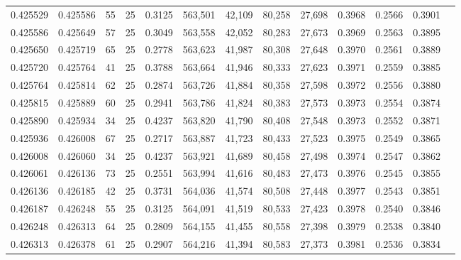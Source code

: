 \begin{tabular}{rrrrrrrrrrrrr}
0.425529 & 0.425586 &    55 &  25 &                                     0.3125 & 563,501 &  42,109 &  80,258 &  27,698 & 0.3968 & 0.2566 & 0.3901 \\
0.425586 & 0.425649 &    57 &  25 &                                     0.3049 & 563,558 &  42,052 &  80,283 &  27,673 & 0.3969 & 0.2563 & 0.3895 \\
0.425650 & 0.425719 &    65 &  25 &                                     0.2778 & 563,623 &  41,987 &  80,308 &  27,648 & 0.3970 & 0.2561 & 0.3889 \\
0.425720 & 0.425764 &    41 &  25 &                                     0.3788 & 563,664 &  41,946 &  80,333 &  27,623 & 0.3971 & 0.2559 & 0.3885 \\
0.425764 & 0.425814 &    62 &  25 &                                     0.2874 & 563,726 &  41,884 &  80,358 &  27,598 & 0.3972 & 0.2556 & 0.3880 \\
0.425815 & 0.425889 &    60 &  25 &                                     0.2941 & 563,786 &  41,824 &  80,383 &  27,573 & 0.3973 & 0.2554 & 0.3874 \\
0.425890 & 0.425934 &    34 &  25 &                                     0.4237 & 563,820 &  41,790 &  80,408 &  27,548 & 0.3973 & 0.2552 & 0.3871 \\
0.425936 & 0.426008 &    67 &  25 &                                     0.2717 & 563,887 &  41,723 &  80,433 &  27,523 & 0.3975 & 0.2549 & 0.3865 \\
0.426008 & 0.426060 &    34 &  25 &                                     0.4237 & 563,921 &  41,689 &  80,458 &  27,498 & 0.3974 & 0.2547 & 0.3862 \\
0.426061 & 0.426136 &    73 &  25 &                                     0.2551 & 563,994 &  41,616 &  80,483 &  27,473 & 0.3976 & 0.2545 & 0.3855 \\
0.426136 & 0.426185 &    42 &  25 &                                     0.3731 & 564,036 &  41,574 &  80,508 &  27,448 & 0.3977 & 0.2543 & 0.3851 \\
0.426187 & 0.426248 &    55 &  25 &                                     0.3125 & 564,091 &  41,519 &  80,533 &  27,423 & 0.3978 & 0.2540 & 0.3846 \\
0.426248 & 0.426313 &    64 &  25 &                                     0.2809 & 564,155 &  41,455 &  80,558 &  27,398 & 0.3979 & 0.2538 & 0.3840 \\
0.426313 & 0.426378 &    61 &  25 &                                     0.2907 & 564,216 &  41,394 &  80,583 &  27,373 & 0.3981 & 0.2536 & 0.3834 \\

\end{tabular}
